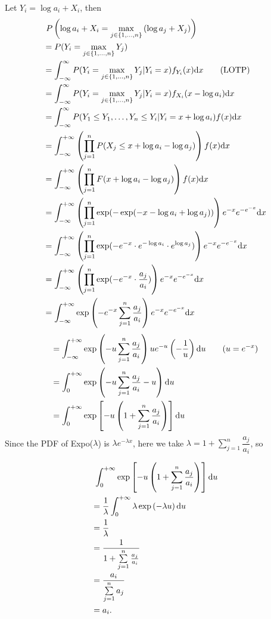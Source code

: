 \begin{homeworkProblem}
Let $Y_i=\log a_i+X_i$, then
\begin{align*}
&\ P\left(\log a_i+X_i=\max_{j \in\{1, \ldots, n\}}\left(\log a_j+X_j\right)\right) \\
&= P(Y_i=\max_{j \in\{1, \ldots, n\}} Y_j) \\
&= \int_{-\infty}^{\infty}P(Y_i=\max_{j \in\{1, \ldots, n\}} Y_j|Y_i=x)f_{Y_i}(x) \mathrm{d}x \qquad\text{(LOTP)} \\
&= \int_{-\infty}^{\infty}P(Y_i=\max_{j \in\{1, \ldots, n\}} Y_j|Y_i=x)f_{X_i}(x-\log a_i) \mathrm{d}x \\
&= \int_{-\infty}^{\infty}P(Y_1\leq Y_1, \ldots, Y_n\leq Y_i|Y_i=x+\log a_i)f(x) \mathrm{d}x \\
&= \int_{-\infty}^{+\infty} \left(\prod_{j=1}^{n} P(X_{j} \leq x + \log a_{i} - \log a_{j})\right)f(x) \mathrm{d}x \\
&= \int_{-\infty}^{+\infty} \left(\prod_{j=1}^{n} F(x + \log a_{i} - \log a_{j})\right)f(x) \mathrm{d}x \\
&= \int_{-\infty}^{+\infty} \left(\prod_{j=1}^{n} \exp(- \exp(-x - \log a_{i} + \log a_{j}))\right) e^{-x}e^{-e^{-x}} \mathrm{d}x \\
&= \int_{-\infty}^{+\infty} \left(\prod_{j=1}^{n} \exp(- e^{-x}\cdot e^{-\log a_{i}} \cdot e^{\log a_{j}})\right) e^{-x}e^{-e^{-x}} \mathrm{d}x \\
&= \int_{-\infty}^{+\infty} \left(\prod_{j=1}^{n} \exp(- e^{-x}\cdot \frac{a_{j}}{a_{i}})\right) e^{-x}e^{-e^{-x}} \mathrm{d}x \\
&= \int_{-\infty}^{+\infty} \exp\left(- e^{-x} \sum_{j=1}^{n} \frac{a_{j}}{a_{i}}\right) e^{-x}e^{-e^{-x}} \mathrm{d}x \\
\end{align*}
\begin{align*}
&= \int_{-\infty}^{+\infty} \exp\left(-u \sum_{j=1}^{n} \frac{a_{j}}{a_{i}}\right) ue^{-u} \left(-\dfrac{1}{u}\right) \mathrm{d}u \qquad (u = e^{-x}) \\
&= \int_{0}^{+\infty} \exp\left(- u \sum_{j=1}^{n} \frac{a_{j}}{a_{i}} - u\right) \mathrm{d}u \\
&= \int_{0}^{+\infty} \exp\left[- u \left(1 + \sum_{j = 1}^{n} \frac{a_{j}}{a_{i}}\right)\right] \mathrm{d}u
\end{align*}
Since the PDF of Expo($\lambda$) is $\lambda e^{-\lambda x}$, here we take $\lambda = 1 + \sum\limits_{j = 1}^{n} \dfrac{a_{j}}{a_{i}}$, so

\begin{align*}
&\ \int_{0}^{+\infty} \exp\left[- u \left(1 + \sum_{j = 1}^{n} \frac{a_{j}}{a_{i}}\right)\right] \mathrm{d}u \\
&= \dfrac{1}{\lambda} \int_{0}^{+\infty} \lambda\exp\left(- \lambda u\right) \mathrm{d}u \\
&= \dfrac{1}{\lambda} \\
&= \dfrac{1}{1 + \sum\limits_{j = 1}^{n} \frac{a_{j}}{a_{i}}} \\
&= \dfrac{a_{i}}{\sum\limits_{j = 1}^{n} a_{j}} \\
&= a_{i}.
\end{align*}


\end{homeworkProblem}
